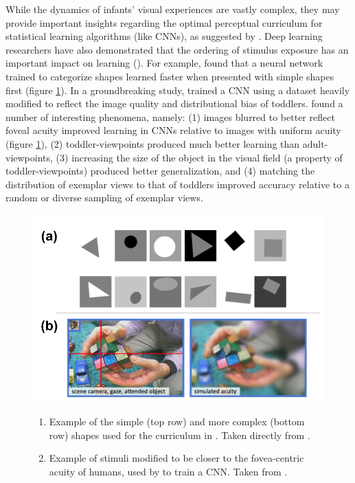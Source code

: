 \documentclass[12pt]{article}
\let\oldcite=\cite
\let\oldtextcite=\textcite
\renewcommand{\cite}[1]{\textcolor[rgb]{0, .121, .388}{\oldcite{#1}}}
\renewcommand{\textcite}[1]{\textcolor[rgb]{0, .121, .388}{\oldtextcite{#1}}}
\begin{document}
While the dynamics of infants' visual experiences are vastly complex, they may provide important insights regarding the optimal perceptual curriculum for statistical learning algorithms (like CNNs), as suggested by \textcite{smith2018developing}. Deep learning researchers have also demonstrated that the ordering of stimulus exposure has an important impact on learning (\cite{krueger2009flexible,bengio2009curriculum}). For example, \textcite{bengio2009curriculum} found that a neural network trained to categorize shapes learned faster when presented with simple shapes first (figure \ref{fig:curricula}). In a groundbreaking study, \textcite{bambach2018toddler} trained a CNN using a dataset heavily modified to reflect the image quality and distributional bias of toddlers. \textcite{bambach2018toddler} found a number of interesting phenomena, namely: (1) images blurred to better reflect foveal acuity improved learning in CNNs relative to images with uniform acuity (figure \ref{fig:curricula}), (2) toddler-viewpoints produced much better learning than adult-viewpoints, (3) increasing the size of the object in the visual field (a property of toddler-viewpoints) produced better generalization, and (4) matching the distribution of exemplar views to that of toddlers improved accuracy relative to a random or diverse sampling of exemplar views. 

\begin{figure}[!h]
    \centering
    \includegraphics[scale=.4]{figures/curricula.png}
    \caption{}
        \begin{enumerate}[label=(\alph*)]
            \item Example of the simple (top row) and more complex (bottom row) shapes used for the curriculum in \textcite{bengio2009curriculum}. Taken directly from \textcite{bengio2009curriculum}. 
            \item Example of stimuli modified to be closer to the fovea-centric acuity of humans, used by \textcite{bambach2018toddler} to train a CNN. Taken from \textcite{bambach2018toddler}.
        \end{enumerate}
    \label{fig:curricula}
\end{figure} 
\end{document}
